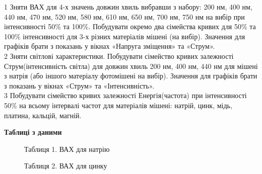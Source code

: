 \documentclass[a4paper,14pt]{extreport}
\begin{document}
1 Зняти ВАХ для 4-х значень довжин хвиль вибравши з набору: 200 нм, 400 нм, 440 нм, 470
нм, 520 нм, 580 нм, 610 нм, 650 нм, 700 нм, 750 нм на вибір при інтенсивності 50\% та 100\%. Побудувати окремо два сімейства кривих для 50\% та 100\% інтенсивності для 3-х різних матеріалів мішені (на вибір). Значення для графіків брати з показань у вікнах «Напруга зміщення» та «Струм».\\

2 Зняти світлові характеристики. Побудувати сімейство кривих залежності
Струм(інтенсивність світла) для довжин хвиль 200 нм, 400 нм, 440 нм для мішені з натрія (або іншого матеріалу фотомішені на вибір). Значення для графіків брати з показань у вікнах «Струм» та «Інтенсивність».\\

3 Побудувати сімейство кривих залежності Енергія(частота) при інтенсивності 50\% на
всьому інтервалі частот для матеріалів мішені: натрій, цинк, мідь, платина, кальцій, магній.\\

\newpage
\begin{center}\textbf{Таблиці з даними}\end{center}\par

\begin{figure}[h]
\caption{Таблиця 1. ВАХ для натрію}
\end{figure}

\begin{figure}[h]
\caption{Таблиця 2. ВАХ для  цинку}
\end{figure}
\end{document}
